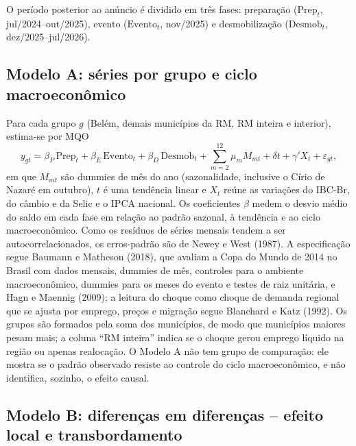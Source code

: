 \documentclass[12pt,a4paper]{article}
\begin{document}
O período posterior ao anúncio é dividido em três fases: preparação ($\text{Prep}_t$,
jul/2024--out/2025), evento ($\text{Evento}_t$, nov/2025) e desmobilização ($\text{Desmob}_t$,
dez/2025--jul/2026).

\subsection{Modelo A: séries por grupo e ciclo macroeconômico}

Para cada grupo $g$ (Belém, demais municípios da RM, RM inteira e interior), estima-se por MQO
\begin{equation}
y_{gt} = \beta_P\,\text{Prep}_t + \beta_E\,\text{Evento}_t + \beta_D\,\text{Desmob}_t
       + \sum_{m=2}^{12}\mu_m M_{mt} + \delta t + \gamma' X_t + \varepsilon_{gt},
\end{equation}
em que $M_{mt}$ são dummies de mês do ano (sazonalidade, inclusive o Círio de Nazaré em outubro), $t$
é uma tendência linear e $X_t$ reúne as variações do IBC-Br, do câmbio e da Selic e o IPCA nacional. Os
coeficientes $\beta$ medem o desvio médio do saldo em cada fase em relação ao padrão sazonal, à
tendência e ao ciclo macroeconômico. Como os resíduos de séries mensais tendem a ser
autocorrelacionados, os erros-padrão são de Newey e West (1987). A especificação segue Baumann e
Matheson (2018), que avaliam a Copa do Mundo de 2014 no Brasil com dados mensais, dummies de mês,
controles para o ambiente macroeconômico, dummies para os meses do evento e testes de raiz unitária, e
Hagn e Maennig (2009); a leitura do choque como choque de demanda regional que se ajusta por
emprego, preços e migração segue Blanchard e Katz (1992). Os grupos são formados pela soma dos municípios, de modo que municípios maiores
pesam mais; a coluna ``RM inteira'' indica se o choque gerou emprego líquido na região ou apenas
realocação. O Modelo A não tem grupo de comparação: ele mostra se o padrão observado resiste ao
controle do ciclo macroeconômico, e não identifica, sozinho, o efeito causal.

\subsection{Modelo B: diferenças em diferenças -- efeito local e transbordamento}
\end{document}
